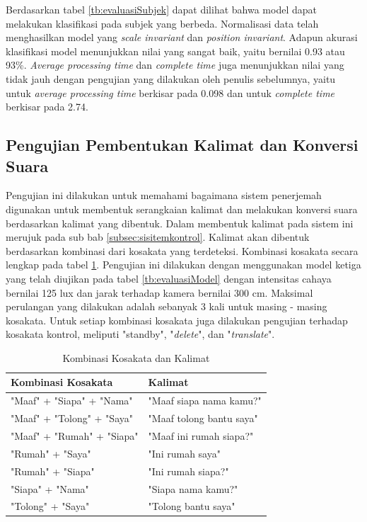 Berdasarkan tabel \ref{tb:evaluasiSubjek} dapat dilihat bahwa model dapat melakukan klasifikasi pada subjek yang berbeda. Normalisasi data telah menghasilkan model yang \emph{scale invariant} dan \emph{position invariant}. Adapun akurasi klasifikasi model menunjukkan nilai yang sangat baik, yaitu bernilai 0.93 atau 93\%. \emph{Average processing time} dan \emph{complete time} juga menunjukkan nilai yang tidak jauh dengan pengujian yang dilakukan oleh penulis sebelumnya, yaitu untuk \emph{average processing time} berkisar pada 0.098 dan untuk \emph{complete time} berkisar pada 2.74. 

\subsection{Pengujian Pembentukan Kalimat dan Konversi Suara}
\label{sec:analisiskalimat}

Pengujian ini dilakukan untuk memahami bagaimana sistem penerjemah digunakan untuk membentuk serangkaian kalimat dan melakukan konversi suara berdasarkan kalimat yang dibentuk. Dalam membentuk kalimat pada sistem ini merujuk pada sub bab \ref{subsec:sisitemkontrol}. Kalimat akan dibentuk berdasarkan kombinasi dari kosakata yang terdeteksi. Kombinasi kosakata secara lengkap pada tabel \ref{tb:kombinasiKosakata}. Pengujian ini dilakukan dengan menggunakan model ketiga yang telah diujikan pada tabel \ref{tb:evaluasiModel} dengan intensitas cahaya bernilai 125 lux dan jarak terhadap kamera bernilai 300 cm. Maksimal perulangan yang dilakukan adalah sebanyak 3 kali untuk masing - masing kosakata. Untuk setiap kombinasi kosakata juga dilakukan pengujian terhadap kosakata kontrol, meliputi "standby", "\emph{delete}", dan "\emph{translate}".

\begin{table}[H]
  \caption{Kombinasi Kosakata dan Kalimat}
  \label{tb:kombinasiKosakata}
  \centering
  \begin{tabular}{ll}
    \hline
    \textbf{Kombinasi Kosakata} & \textbf{Kalimat} \\
    \hline
    "Maaf" + "Siapa" + "Nama" & "Maaf siapa nama kamu?" \\
    "Maaf" + "Tolong" + "Saya" & "Maaf tolong bantu saya" \\
    "Maaf" + "Rumah" + "Siapa" & "Maaf ini rumah siapa?" \\
    "Rumah" + "Saya" & "Ini rumah saya" \\
    "Rumah" + "Siapa" & "Ini rumah siapa?" \\
    "Siapa" + "Nama" & "Siapa nama kamu?" \\
    "Tolong" + "Saya" & "Tolong bantu saya" \\
    \hline
  \end{tabular}
\end{table}


